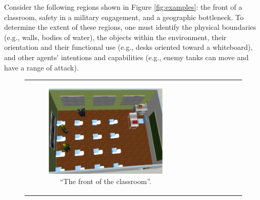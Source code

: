 \documentclass[11pt,letterpaper]{article}
\begin{document}
Consider the following regions shown in Figure \ref{fig:examples}: the front of a classroom, safety in a military engagement, and a geographic bottleneck.  To determine the extent of these regions, one must identify the physical boundaries (e.g., walls, bodies of water), the objects within the environment, their orientation and their functional use (e.g., desks oriented toward a whiteboard), and other agents' intentions and capabilities (e.g., enemy tanks can move and have a range of attack).%

\begin{figure}
\centering
\begin{tabular}{c c c} 
  \begin{subfigure}[b]{0.32\textwidth}
  \includegraphics[width=\textwidth]{figures/classroom.png}
  \caption{``The front of the classroom''.}
  \end{subfigure} &
\begin{subfigure}[b]{0.32\textwidth}

\end{subfigure}
\end{tabular}
\end{figure}
\end{document}

